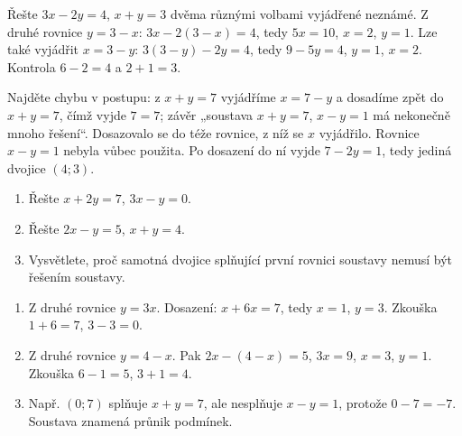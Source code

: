 \documentclass[11pt,a4paper]{article}
\begin{document}
\begin{zadaniReseniBox}
Řešte $3x-2y=4$, $x+y=3$ dvěma různými volbami vyjádřené neznámé.
\tcblower
Z druhé rovnice $y=3-x$: $3x-2(3-x)=4$, tedy $5x=10$, $x=2$, $y=1$. Lze také vyjádřit $x=3-y$: $3(3-y)-2y=4$, tedy $9-5y=4$, $y=1$, $x=2$. Kontrola $6-2=4$ a $2+1=3$.
\end{zadaniReseniBox}
\begin{zadaniReseniBox}
Najděte chybu v postupu: z $x+y=7$ vyjádříme $x=7-y$ a dosadíme zpět do $x+y=7$, čímž vyjde $7=7$; závěr „soustava $x+y=7$, $x-y=1$ má nekonečně mnoho řešení“.
\tcblower
Dosazovalo se do téže rovnice, z níž se $x$ vyjádřilo. Rovnice $x-y=1$ nebyla vůbec použita. Po dosazení do ní vyjde $7-2y=1$, tedy jediná dvojice $(4;3)$.
\end{zadaniReseniBox}
\begin{zadaniReseniBox}
\begin{enumerate}[label=\alph*)]
\item Řešte $x+2y=7$, $3x-y=0$.
\item Řešte $2x-y=5$, $x+y=4$.
\item Vysvětlete, proč samotná dvojice splňující první rovnici soustavy nemusí být řešením soustavy.
\end{enumerate}
\tcblower
\begin{enumerate}[label=\alph*)]
\item Z druhé rovnice $y=3x$. Dosazení: $x+6x=7$, tedy $x=1$, $y=3$. Zkouška $1+6=7$, $3-3=0$.
\item Z druhé rovnice $y=4-x$. Pak $2x-(4-x)=5$, $3x=9$, $x=3$, $y=1$. Zkouška $6-1=5$, $3+1=4$.
\item Např. $(0;7)$ splňuje $x+y=7$, ale nesplňuje $x-y=1$, protože $0-7=-7$. Soustava znamená průnik podmínek.
\end{enumerate}
\end{zadaniReseniBox}
\end{document}
